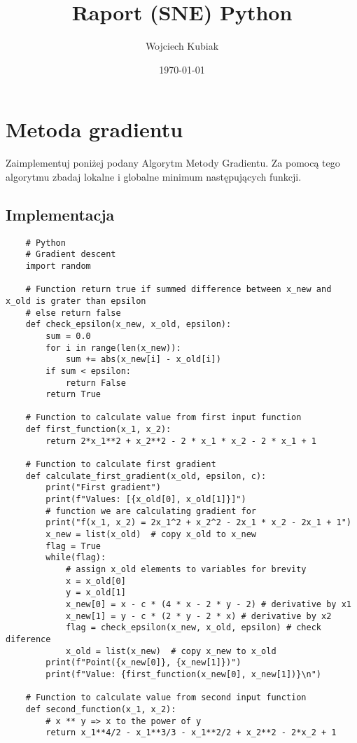 \documentclass[11pt]{article}
\title{\textbf{Raport (SNE) Python}}
\author{Wojciech Kubiak}
\date{\today}
\begin{document}
\maketitle
\section{Metoda gradientu}
Zaimplementuj poniżej podany Algorytm Metody Gradientu. Za pomocą tego
algorytmu zbadaj lokalne i globalne minimum następujących funkcji.

\subsection{Implementacja}
\begin{lstlisting}
    # Python
    # Gradient descent
    import random
    
    # Function return true if summed difference between x_new and x_old is grater than epsilon
    # else return false
    def check_epsilon(x_new, x_old, epsilon):
        sum = 0.0
        for i in range(len(x_new)):
            sum += abs(x_new[i] - x_old[i])
        if sum < epsilon:
            return False
        return True
    
    # Function to calculate value from first input function
    def first_function(x_1, x_2):
        return 2*x_1**2 + x_2**2 - 2 * x_1 * x_2 - 2 * x_1 + 1
    
    # Function to calculate first gradient
    def calculate_first_gradient(x_old, epsilon, c):
        print("First gradient")
        print(f"Values: [{x_old[0], x_old[1]}]")
        # function we are calculating gradient for
        print("f(x_1, x_2) = 2x_1^2 + x_2^2 - 2x_1 * x_2 - 2x_1 + 1")
        x_new = list(x_old)  # copy x_old to x_new
        flag = True
        while(flag):
            # assign x_old elements to variables for brevity
            x = x_old[0]
            y = x_old[1]
            x_new[0] = x - c * (4 * x - 2 * y - 2) # derivative by x1
            x_new[1] = y - c * (2 * y - 2 * x) # derivative by x2
            flag = check_epsilon(x_new, x_old, epsilon) # check diference
            x_old = list(x_new)  # copy x_new to x_old
        print(f"Point({x_new[0]}, {x_new[1]})")
        print(f"Value: {first_function(x_new[0], x_new[1])}\n")
    
    # Function to calculate value from second input function
    def second_function(x_1, x_2):
        # x ** y => x to the power of y
        return x_1**4/2 - x_1**3/3 - x_1**2/2 + x_2**2 - 2*x_2 + 1
    

\end{lstlisting}
\end{document}
